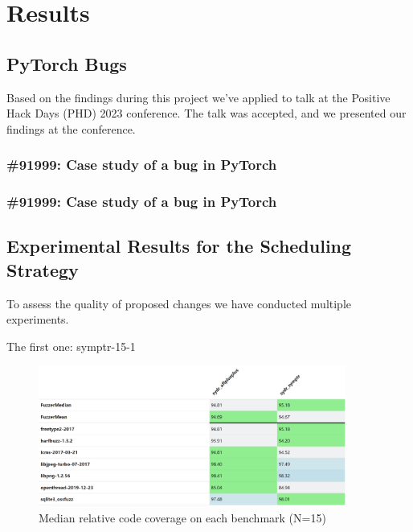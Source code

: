 \section{Results}

\subsection{PyTorch Bugs} \label{results:pytorch-bugs}

Based on the findings during this project we've applied to talk at the Positive Hack Days (PHD) 2023 conference. The talk was accepted, and we presented our findings at the conference.

\subsubsection{\#91999: Case study of a bug in PyTorch}
\subsubsection{\#91999: Case study of a bug in PyTorch}

\subsection{Experimental Results for the Scheduling Strategy} \label{results:symbolic-pointers-modeling-scheduling}

To assess the quality of proposed changes we have conducted multiple experiments.

The first one: symptr-15-1

\begin{figure}[h]
    \centering
    \includegraphics[width=0.9\textwidth]{assets/fuzzbench/symptr-15-1/median-relative-code-coverage-on-each-benchmark.png}
    \caption{Median relative code coverage on each benchmark (N=15)}
    \label{fig:fuzzbench-symptr-15-1-coverage}
\end{figure}

